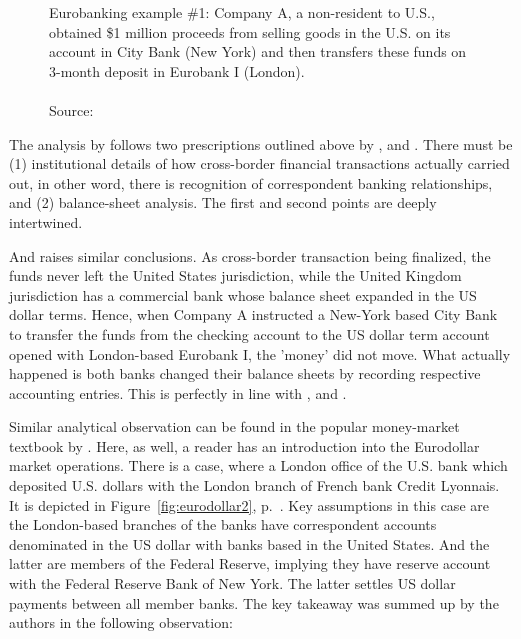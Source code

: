 \begin{figure}[!ht]
  \caption[Eurobanking example \#1]%
  {Eurobanking example \#1: Company A, a non-resident to U.S., obtained \$1 million proceeds from selling goods in the U.S. on its account in City Bank (New York) and then transfers these funds on 3-month deposit in Eurobank I (London). \\ \\Source: \citep[p.~2]{hewson1975}}
\label{fig:eurodollar1}
\end{figure}

The analysis by \citeauthor{hewson1975} follows two prescriptions outlined above by \citep{woodruff2005}, \citep{mosler2010,mosler2022,mosler2023} and \citep{payoff2021}. There must be (1) institutional details of how cross-border financial transactions actually carried out, in other word, there is recognition of correspondent banking relationships, and (2) balance-sheet analysis. The first and second points are deeply intertwined.

And \cite{hewson1975} raises similar conclusions. As cross-border transaction being finalized, the funds never left the United States jurisdiction, while the United Kingdom jurisdiction has a commercial bank whose balance sheet expanded in the US dollar terms. Hence, when Company A instructed a New-York based City Bank to transfer the funds from the checking account to the US dollar term account opened with London-based Eurobank I, the 'money' did not move. What actually happened is both banks changed their balance sheets by recording respective accounting entries. This is perfectly in line with \citep{woodruff2005}, \citep{mosler2010,mosler2022,mosler2023} and \citep{payoff2021}.

Similar analytical observation can be found in the popular money-market textbook by \cite{stigum2007}. Here, as well, a reader has an introduction into the Eurodollar market operations. There is a case, where a London office of the U.S. bank which deposited U.S. dollars with the London branch of French bank Credit Lyonnais. It is depicted in \mbox{Figure \ref{fig:eurodollar2}}, \mbox{p. \pageref{fig:eurodollar1}}. Key assumptions in this case are the London-based branches of the banks have correspondent accounts denominated in the US dollar with banks based in the United States. And the latter are members of the Federal Reserve, implying they have reserve account with the Federal Reserve Bank of New York. The latter settles US dollar payments between all member banks. The key takeaway was summed up by the authors in the following observation:

